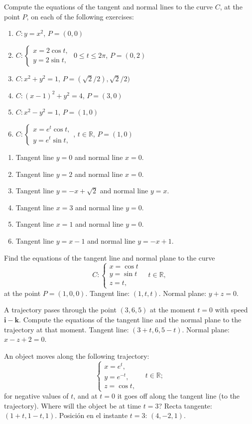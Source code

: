 {Compute the equations of the tangent and normal lines to the curve
$C$, at the point $P$, on each of the following exercises:
\begin{enumerate}
\item $C: y=x^2$, $P=(0,0)$
\item $C: \begin{cases}
x=2\cos t,\\
y=2\sin t,
\end{cases}
$ $0\leq t\leq 2\pi$, $P=(0,2)$
\item $C:x^2+y^2=1$, $P=(\sqrt{2}/2),\sqrt{2}/2)$
\item $C:(x-1)^2+y^2=4$, $P=(3,0)$
\item $C:x^2-y^2=1$, $P=(1,0)$
\item $C:\begin{cases}
x=e^t\cos t,\\
y=e^t\sin t,
\end{cases}
$, $t\in \mathbb{R}$, $P=(1,0)$
\end{enumerate}
}
{
\begin{enumerate}
\item Tangent line $y=0$ and normal line $x=0$.
\item Tangent line $y=2$ and normal line $x=0$.
\item Tangent line $y=-x+\sqrt{2}$ and normal line $y=x$.
\item Tangent line $x=3$ and normal line $y=0$.
\item Tangent line $x=1$ and normal line $y=0$.
\item Tangent line $y=x-1$ and normal line $y=-x+1$.
\end{enumerate}
}
{
}


{Find the equations of the tangent line and normal plane to the curve
\[
C:
\begin{cases}
x=\cos t \\
y=\sin t\\
z= t,
\end{cases}
\quad t\in \mathbb{R},
\]
at the point $P=(1,0,0)$.
}
{Tangent line: $(1,t,t)$. Normal plane: $y+z=0$.
}
{
}


{A trajectory pases through the point $(3,6,5)$ at the moment $t=0$ with speed $\mathbf{i}-\mathbf{k}$.
Compute the equations of the tangent line and the normal plane to the trajectory at that moment.
}
{Tangent line: $(3+t,6,5-t)$. Normal plane: $x-z+2=0$.
}
{
}


{An object moves along the following trajectory:
\[
\begin{cases}
x=e^t,\\
y=e^{-t},\\
z=\cos t,
\end{cases}
\quad t\in \mathbb{R};
\]
for negative values of $t$, and at $t=0$ it goes off along the tangent line (to the trajectory).
Where will the object be at time $t=3$?
}
{Recta tangente: $(1+t,1-t,1)$. Posición en el instante $t=3$: $(4,-2,1)$.
}
{
}
